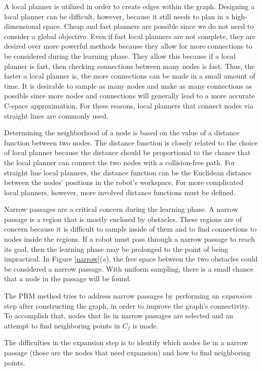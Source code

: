 \documentclass[10pt,conference]{ieeeconf}
\begin{document}
A local planner is utilized in order to create edges within the graph. Designing a local planner can be difficult, however, because it still needs to plan in a high-dimensional space. Cheap and fast planners are possible since we do not need to consider a global objective. Even if fast local planners are not complete, they are desired over more powerful methods because they allow for more connections to be considered during the learning phase. They allow this because if a local planner is fast, then checking connections between many nodes is fast. Thus, the faster a local planner is, the more connections can be made in a small amount of time. It is desirable to sample as many nodes and make as many connections as possible since more nodes and connections will generally lead to a more accurate C-space approximation. For these reasons, local planners that connect nodes via straight lines are commonly used.

Determining the neighborhood of a node is based on the value of a distance function between two nodes. The distance function is closely related to the choice of local planner because the distance should be proportional to the chance that the local planner can connect the two nodes with a collision-free path. For straight line local planners, the distance function can be the Euclidean distance between the nodes' positions in the robot's workspace. For more complicated local planners, however, more involved distance functions must be defined.  

Narrow passages are a critical concern during the learning phase. A narrow passage is a region that is mostly enclosed by obstacles. These regions are of concern because it is difficult to sample inside of them and to find connections to nodes inside the regions. If a robot must pass through a narrow passage to reach its goal, then the learning phase may be prolonged to the point of being impractical. In Figure \ref{narrow}(a), the free space between the two obstacles could be considered a narrow passage. With uniform sampling, there is a small chance that a node in the passage will be found.  

The PRM method tries to address narrow passages by performing an \emph{expansion} step after constructing the graph, in order to improve the graph's connectivity. To accomplish that, nodes that lie in narrow passages are selected and an attempt to find neighboring points in $C_f$ is made. 

The difficulties in the expansion step is to identify which nodes lie in a narrow passage (those are the nodes that need expansion) and how to find neighboring points.
\end{document}
